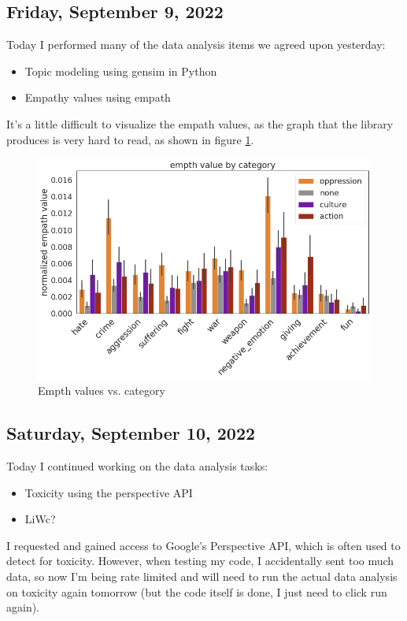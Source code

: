 \documentclass[11pt,letterpaper]{article}
\begin{document}
\subsection{Friday, September 9, 2022}
Today I performed many of the data analysis items we agreed upon yesterday:
\begin{itemize}
    \item Topic modeling using gensim in Python
    \item Empathy values using empath
\end{itemize}

It's a little difficult to visualize the empath values, as the graph that the library produces is very hard to read, as shown in figure \ref{fig:empth}.
\begin{figure}
    \centering
    \includegraphics[scale=0.5]{images/empth.png}
    \caption{Empth values vs. category}
    \label{fig:empth}
\end{figure}

\subsection{Saturday, September 10, 2022}
Today I continued working on the data analysis tasks:
\begin{itemize}
    \item Toxicity using the perspective API
    \item LiWc?
\end{itemize}

I requested and gained access to Google's Perspective API, which is often used to detect for toxicity. However, when testing my code, I accidentally sent too much data, so now I'm being rate limited and will need to run the actual data analysis on toxicity again tomorrow (but the code itself is done, I just need to click run again).
\end{document}
